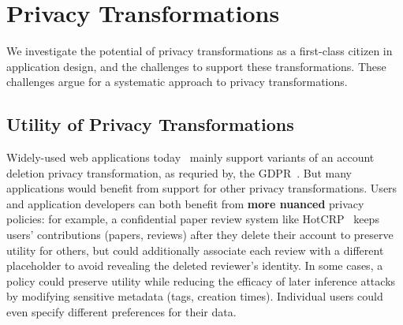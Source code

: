 \section{Privacy Transformations}
\label{sec:survey}
%
We investigate the potential of privacy transformations as a first-class
citizen in application design, and the challenges to support these
transformations.
%
These challenges argue for a systematic approach to privacy transformations.
%

\subsection{Utility of Privacy Transformations}
%
Widely-used web applications today~\cite{spotify:privacy, amazon:privacy,
strava:privacy, hotcrp:privacy, wikipedia:privacy, facebook:privacy, twitter:privacy,
reddit:privacy, github:privacy, lobsters:privacy} mainly support variants of an account
deletion privacy transformation, as requried by, \eg the GDPR~\cite[Art.\ 17]{eu:gdpr}.
%
But many applications would benefit from support for other privacy transformations.
%
Users and application developers can both benefit from \textbf{more nuanced} privacy policies:
for example, a confidential paper review system like HotCRP~\cite{hotcrp} keeps users'
contributions (papers, reviews) after they delete their account to preserve utility for others, but
could additionally associate each review with a different placeholder to avoid revealing the deleted
reviewer's identity.
%
In some cases, a policy could preserve utility while reducing the efficacy of later inference
attacks by \eg modifying sensitive metadata (\eg tags, creation times).
%
%
%
Individual users could even specify different preferences for their data.
%
%

